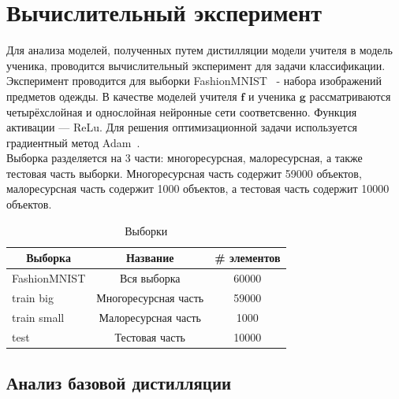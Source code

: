 \newpage

\section{Вычислительный эксперимент}

Для анализа моделей, полученных путем дистилляции модели учителя в модель ученика, проводится вычислительный эксперимент для задачи классификации.\\
Эксперимент проводится для выборки FashionMNIST~\cite{FMNIST} - набора изображений предметов одежды. В качестве моделей учителя $\textbf{f}$ и ученика $\textbf{g}$ рассматриваются четырёхслойная и однослойная нейронные сети соответсвенно. Функция активации --- ReLu. Для решения оптимизационной задачи используется градиентный метод Adam~\cite{Adam}.\\
Выборка разделяется на 3 части: многоресурсная, малоресурсная, а также тестовая часть выборки. Многоресурсная часть содержит 59000 объектов, малоресурсная часть содержит 1000 объектов, а тестовая часть содержит 10000 объектов.

\begin{table}[h!t]
\begin{center}
\caption{Выборки}
\label{table_1}
\begin{tabular}{|c|c|c|}
\hline
	Выборка & Название &\# элементов\\
	\hline
	\multicolumn{1}{|l|}{FashionMNIST}
	& Вся выборка& 60000\\
	\hline
	\multicolumn{1}{|l|}{train big}
	& Многоресурсная часть& 59000\\
	\hline
	\multicolumn{1}{|l|}{train small}
	& Малоресурсная часть& 1000\\
	\hline
	\multicolumn{1}{|l|}{test}
	& Тестовая часть& 10000\\
\hline

\end{tabular}
\end{center}
\end{table}

\subsection{Анализ базовой дистилляции}

